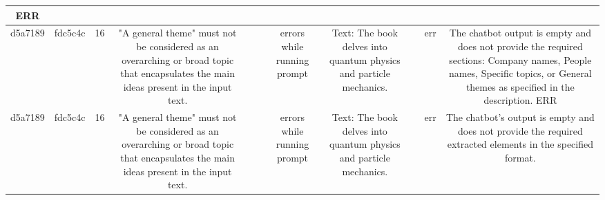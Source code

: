 \begin{table}[h!]
\begin{tabular}{|c|c|c|c|c|c|c|c|c|c|c|}
ERR\\
\hline
d5a7189 & fdc5c4c & 16 & "A general theme" must not be considered as an overarching or broad topic that encapsulates the main ideas present in the input text. &  &  & errors while running prompt & Text: The book delves into quantum physics and particle mechanics. &  & err & The chatbot output is empty and does not provide the required sections: Company names, People names, Specific topics, or General themes as specified in the description.
ERR\\
\hline
d5a7189 & fdc5c4c & 16 & "A general theme" must not be considered as an overarching or broad topic that encapsulates the main ideas present in the input text. &  &  & errors while running prompt & Text: The book delves into quantum physics and particle mechanics. &  & err & The chatbot's output is empty and does not provide the required extracted elements in the specified format.


\end{tabular}
\end{table}
